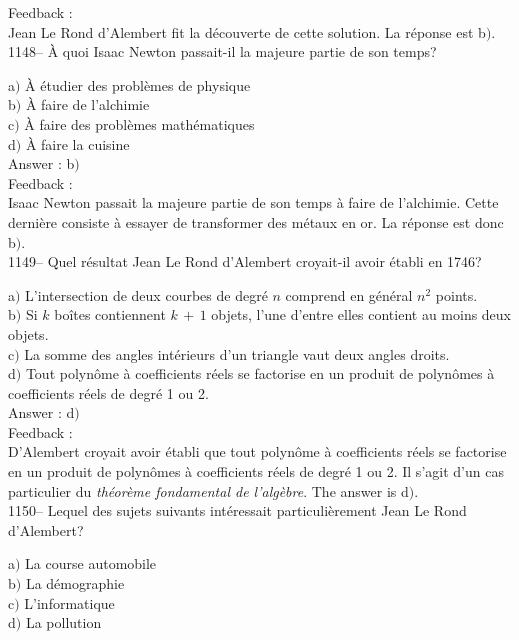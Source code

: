 \documentclass[letterpaper, 12pt]{article}
\begin{document}
Feedback : \\
Jean Le Rond d'Alembert fit la d\'ecouverte de cette solution. La r\'eponse
est b$)$.\\

1148-- \`A quoi Isaac Newton passait-il la majeure partie de son
temps?

a$)$ \`A \'etudier des probl\`emes de physique \\
b$)$ \`A faire de l'alchimie \\
c$)$ \`A faire des probl\`emes math\'ematiques \\
d$)$ \`A faire la cuisine  \\

Answer : b$)$\\

Feedback : \\
Isaac Newton passait la majeure partie de son temps \`a faire de l'alchimie.
Cette derni\`ere consiste \`a essayer de transformer des m\'etaux en or. La
r\'eponse est donc b$)$.\\

1149-- Quel r\'esultat Jean Le Rond d'Alembert croyait-il avoir
\'etabli en 1746?

a$)$ L'intersection de deux courbes de degr\'e $n$ comprend en g\'en\'eral
$n^2$ points. \\
b$)$ Si $k$ bo\^ites contiennent $k\,+\,1$ objets, l'une d'entre elles
contient au moins deux objets. \\
c$)$ La somme des angles int\'erieurs d'un triangle vaut deux angles droits.
\\
d$)$ Tout polyn\^ome \`a coefficients r\'eels se factorise en un produit de
polyn\^omes \`a coefficients r\'eels de degr\'e 1 ou 2.\\

Answer : d$)$\\

Feedback : \\
D'Alembert croyait avoir \'etabli que tout polyn\^ome \`a
coefficients r\'eels se factorise en un produit de polyn\^omes \`a
coefficients r\'eels de degr\'e 1 ou 2. Il s'agit d'un cas
particulier du {\sl th\'eor\`eme fondamental de l'alg\`ebre}.
The answer is d$)$.\\

1150-- Lequel des sujets suivants int\'eressait particuli\`erement
Jean Le Rond d'Alembert?

a$)$ La course automobile \\
b$)$ La d\'emographie \\
c$)$ L'informatique  \\
d$)$ La pollution \\
\end{document}
